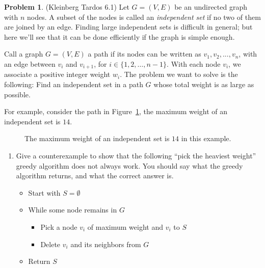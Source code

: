 \documentclass[12pt]{article}
\theoremstyle{definition}
\newtheorem{question}{Problem}
\begin{document}
\newpage
\begin{question}(Kleinberg Tardos 6.1) 
Let $G = (V, E)$ be an undirected graph with $n$ nodes. A subset of the nodes is called an \emph{independent set} if no two of them are joined by an edge. Finding large independent sets is difficult in general; but here we'll see that it can be done efficiently if the graph is simple enough.
	
Call a graph $G =(V, E)$ a path if its nodes can be written as $v_{1}, v_{2}, . . . , v_{n}$, with an edge between $v_{i}$ and $v_{i+1}$, for $i \in \{1, 2, \ldots, n-1\}$. With each node $v_{i}$, we associate a positive integer weight $w_{i}$. The problem we want to solve is the following: Find an independent set in a path $G$ whose total weight is as large as possible.


For example, consider the path in Figure~\ref{fig:path}, the maximum weight of an independent set is $14$.

\begin{figure}[h]
    \centering
    \caption{The maximum weight of an independent set is $14$ in this example.}\label{fig:path}
  \end{figure}
  



\begin{enumerate}[label = (\alph*)]
  \item Give a counterexample to show that the following ``pick the heaviest weight'' greedy algorithm does not always work.  You should say what the greedy algorithm returns,
   and what the correct answer is.

    \begin{itemize}[noitemsep, nolistsep]
      \item Start with $S = \emptyset$
      \item While some node remains in $G$
        \begin{itemize}
          \item Pick a node $v_i$ of maximum weight and $v_i$ to $S$
          \item Delete $v_i$ and its neighbors from $G$
        \end{itemize}
      \item Return $S$
    \end{itemize}


\end{enumerate}
\end{question}
\end{document}

